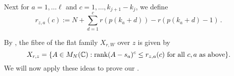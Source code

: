 \documentclass[draft]{article} %
\begin{document}
Next for $ a = 1, \dots \ell $ and $ c = 1, \dots, k_{j+1} - k_j$, we define
$$
    r_{z,a}(c):= N + \sum_{d = 1}^c r(p(k_a + d)) - r(p(k_a + d) - 1)  \, . 
$$

% 
By \cite[Corollary 2.2]{eisenbud1989rank}, the fibre of the flat family $ X_{r,W} $ over $ z$ is given by
\begin{equation} 
    \label{eq:ESfibre}
    X_{r,z} = \{ A \in M_N(\mathbb C) :\operatorname{rank} (A-s_a)^c\le r_{z,a}(c) \text{ for all } c , a \text{ as above}\}.
\end{equation}
% 
We will now apply these ideas to prove our .
% 
\end{document}

